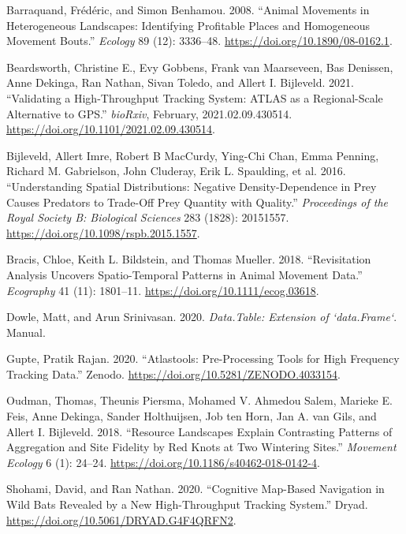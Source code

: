 \documentclass[]{scrreprt}
\begin{document}
\hypertarget{refs}{}
\leavevmode\hypertarget{ref-barraquand2008}{}%
Barraquand, Frédéric, and Simon Benhamou. 2008. ``Animal Movements in Heterogeneous Landscapes: Identifying Profitable Places and Homogeneous Movement Bouts.'' \emph{Ecology} 89 (12): 3336--48. \url{https://doi.org/10.1890/08-0162.1}.

\leavevmode\hypertarget{ref-beardsworth2021}{}%
Beardsworth, Christine E., Evy Gobbens, Frank van Maarseveen, Bas Denissen, Anne Dekinga, Ran Nathan, Sivan Toledo, and Allert I. Bijleveld. 2021. ``Validating a High-Throughput Tracking System: ATLAS as a Regional-Scale Alternative to GPS.'' \emph{bioRxiv}, February, 2021.02.09.430514. \url{https://doi.org/10.1101/2021.02.09.430514}.

\leavevmode\hypertarget{ref-bijleveld2016}{}%
Bijleveld, Allert Imre, Robert B MacCurdy, Ying-Chi Chan, Emma Penning, Richard M. Gabrielson, John Cluderay, Erik L. Spaulding, et al. 2016. ``Understanding Spatial Distributions: Negative Density-Dependence in Prey Causes Predators to Trade-Off Prey Quantity with Quality.'' \emph{Proceedings of the Royal Society B: Biological Sciences} 283 (1828): 20151557. \url{https://doi.org/10.1098/rspb.2015.1557}.

\leavevmode\hypertarget{ref-bracis2018}{}%
Bracis, Chloe, Keith L. Bildstein, and Thomas Mueller. 2018. ``Revisitation Analysis Uncovers Spatio-Temporal Patterns in Animal Movement Data.'' \emph{Ecography} 41 (11): 1801--11. \url{https://doi.org/10.1111/ecog.03618}.

\leavevmode\hypertarget{ref-dowle2020}{}%
Dowle, Matt, and Arun Srinivasan. 2020. \emph{Data.Table: Extension of `data.Frame`}. Manual.

\leavevmode\hypertarget{ref-gupte2020a}{}%
Gupte, Pratik Rajan. 2020. ``Atlastools: Pre-Processing Tools for High Frequency Tracking Data.'' Zenodo. \url{https://doi.org/10.5281/ZENODO.4033154}.

\leavevmode\hypertarget{ref-oudman2018}{}%
Oudman, Thomas, Theunis Piersma, Mohamed V. Ahmedou Salem, Marieke E. Feis, Anne Dekinga, Sander Holthuijsen, Job ten Horn, Jan A. van Gils, and Allert I. Bijleveld. 2018. ``Resource Landscapes Explain Contrasting Patterns of Aggregation and Site Fidelity by Red Knots at Two Wintering Sites.'' \emph{Movement Ecology} 6 (1): 24--24. \url{https://doi.org/10.1186/s40462-018-0142-4}.

\leavevmode\hypertarget{ref-shohami2020}{}%
Shohami, David, and Ran Nathan. 2020. ``Cognitive Map-Based Navigation in Wild Bats Revealed by a New High-Throughput Tracking System.'' Dryad. \url{https://doi.org/10.5061/DRYAD.G4F4QRFN2}.
\end{document}
